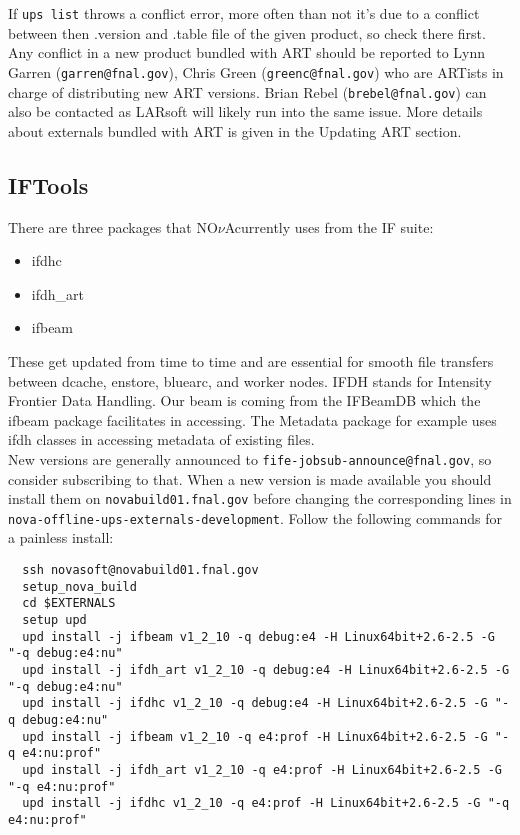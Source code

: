 \documentclass[letterpaper,10pt]{article}
\newcommand{\nova}{NO$\nu$A}
\newcommand{\novas}{\nova \space}
\begin{document}
\noindent
If \verb|ups list| throws a conflict error, more often than not it's due to a conflict between then .version and .table file of the given product, so check there first. Any conflict in a new product bundled with ART should be reported to Lynn Garren (\verb|garren@fnal.gov|), Chris Green (\verb|greenc@fnal.gov|) who are ARTists in charge of distributing new ART versions. Brian Rebel (\verb|brebel@fnal.gov|) can also be contacted as LARsoft will likely run into the same issue. More details about externals bundled with ART is given in the Updating ART section.

\subsection{IFTools}
There are three packages that \novas currently uses from the IF suite:
\begin{itemize}
\item ifdhc
\item ifdh\_art
\item ifbeam
\end{itemize}

\noindent
These get updated from time to time and are essential for smooth file transfers between dcache, enstore, bluearc, and worker nodes. IFDH stands for Intensity Frontier Data Handling. Our beam is coming from the IFBeamDB which the ifbeam package facilitates in accessing. The Metadata package for example uses ifdh classes in accessing metadata of existing files. \\

\noindent
New versions are generally announced to \verb|fife-jobsub-announce@fnal.gov|, so consider subscribing to that. When a new version is made available you should install them on \verb|novabuild01.fnal.gov| before changing the corresponding lines in \verb|nova-offline-ups-externals-development|. Follow the following commands for a painless install:
\begin{verbatim}
  ssh novasoft@novabuild01.fnal.gov
  setup_nova_build
  cd $EXTERNALS
  setup upd
  upd install -j ifbeam v1_2_10 -q debug:e4 -H Linux64bit+2.6-2.5 -G "-q debug:e4:nu" 
  upd install -j ifdh_art v1_2_10 -q debug:e4 -H Linux64bit+2.6-2.5 -G "-q debug:e4:nu" 
  upd install -j ifdhc v1_2_10 -q debug:e4 -H Linux64bit+2.6-2.5 -G "-q debug:e4:nu" 
  upd install -j ifbeam v1_2_10 -q e4:prof -H Linux64bit+2.6-2.5 -G "-q e4:nu:prof" 
  upd install -j ifdh_art v1_2_10 -q e4:prof -H Linux64bit+2.6-2.5 -G "-q e4:nu:prof" 
  upd install -j ifdhc v1_2_10 -q e4:prof -H Linux64bit+2.6-2.5 -G "-q e4:nu:prof" 
\end{verbatim}
\end{document}
